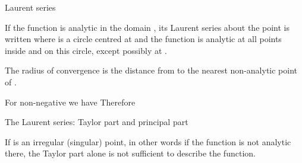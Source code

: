 \EMhold


\begin{EMtheorem}{Laurent series}

If the function  is analytic in the domain , its Laurent series about the point  is written
where  is a circle centred at  and the function is analytic at all points inside and on this circle, except possibly at .

The radius of convergence is the distance from  to the nearest non-analytic point of .

\end{EMtheorem}

For non-negative  we have
Therefore

\begin{EMimportant}{The Laurent series: Taylor part and principal part}


\end{EMimportant}

If  is an irregular (singular) point, in other words if the function is not analytic there, the Taylor part alone is not sufficient to describe the function.

\EMhold

